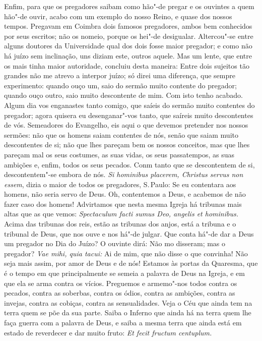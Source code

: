Enfim, para que os pregadores saibam como hão"-de pregar e os ouvintes a
quem hão"-de ouvir, acabo com um exemplo do nosso Reino, e quase dos
nossos tempos. Pregavam em Coimbra dois famosos pregadores, ambos bem
conhecidos por seus escritos; não os nomeio, porque os hei"-de
desigualar. Altercou"-se entre alguns doutores da Universidade qual dos
dois fosse maior pregador; e como não há juízo sem inclinação, uns
diziam este, outros aquele. Mas um lente, que entre os mais tinha maior
autoridade, concluiu desta maneira: Entre dois sujeitos tão grandes
não me atrevo a interpor juízo; só direi uma diferença, que sempre experimento: quando ouço um, saio do sermão muito contente do pregador;
quando ouço outro, saio muito descontente de mim.
Com isto tenho acabado. Algum dia vos enganastes tanto comigo, que
saíeis do sermão muito contentes do pregador; agora quisera eu
desenganar"-vos tanto, que saíreis muito descontentes
de vós. Semeadores do Evangelho, eis aqui o que devemos pretender nos
nossos sermões: não que os homens saiam contentes de nós, senão que
saiam muito descontentes de si; não que lhes pareçam bem os nossos
conceitos, mas que lhes pareçam mal os seus costumes, as suas vidas, os
seus passatempos, as suas ambições e, enfim, todos os seus pecados. Conm
tanto que se descontentem de si, descontentem"-se embora de nós. \emph{Si
hominibus placerem, Christus servus non essem}, dizia o maior de
todos os pregadores, S.\,Paulo: Se eu contentara aos homens, não seria
servo de Deus. Oh, contentemos a Deus, e acabemos de não fazer caso
dos homens! Advirtamos que nesta mesma Igreja há tribunas mais altas
que as que vemos: \emph{Spectaculum facti sumus Deo, angelis et hominibus.} Acima das tribunas dos reis, estão as tribunas dos anjos, está
a tribuna e o tribunal de Deus, que nos ouve e nos há"-de julgar. Que
conta há"-de dar a Deus um pregador no Dia do Juízo? O ouvinte dirá:
Não mo disseram; mas o pregador? \emph{Vae mihi, quia tacui:} Ai
de mim, que não disse o que convinha! Não seja mais assim, por amor de
Deus e de nós!
Estamos às portas da Quaresma, que é o tempo em que principalmente se
semeia a palavra de Deus na Igreja, e em que ela se arma contra os
vícios. Preguemos e armemo"-nos todos contra os pecados, contra as
soberbas, contra os ódios, contra as ambições, contra as invejas, contra
as cobiças, contra as sensualidades. Veja o Céu que ainda tem na terra
quem se põe da sua parte. Saiba o Inferno que ainda há na terra quem lhe
faça guerra com a palavra de Deus, e saiba a mesma terra que ainda
está em estado de reverdecer e dar muito fruto: \emph{Et fecit fructum
centuplum.}


